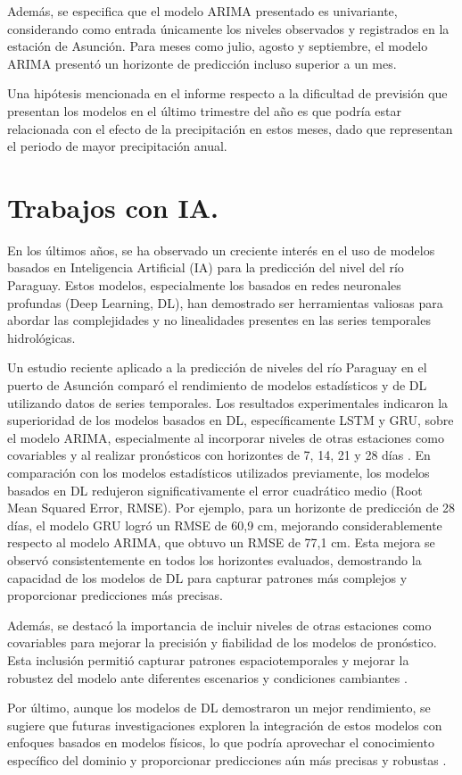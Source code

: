 Además, se especifica que el modelo ARIMA presentado es univariante, considerando como entrada únicamente los niveles observados y registrados en la estación de Asunción. Para meses como julio, agosto y septiembre, el modelo ARIMA presentó un horizonte de predicción incluso superior a un mes.

Una hipótesis mencionada en el informe respecto a la dificultad de previsión que presentan los modelos en el último trimestre del año es que podría estar relacionada con el efecto de la precipitación en estos meses, dado que representan el periodo de mayor precipitación anual.

\section{Trabajos con IA.}

En los últimos años, se ha observado un creciente interés en el uso de modelos basados en Inteligencia Artificial (IA) para la predicción del nivel del río Paraguay. Estos modelos, especialmente los basados en redes neuronales profundas (Deep Learning, DL), han demostrado ser herramientas valiosas para abordar las complejidades y no linealidades presentes en las series temporales hidrológicas.

Un estudio reciente aplicado a la predicción de niveles del río Paraguay en el puerto de Asunción comparó el rendimiento de modelos estadísticos y de DL utilizando datos de series temporales. Los resultados experimentales indicaron la superioridad de los modelos basados en DL, específicamente LSTM y GRU, sobre el modelo ARIMA, especialmente al incorporar niveles de otras estaciones como covariables y al realizar pronósticos con horizontes de 7, 14, 21 y 28 días \cite{amarilla2023comparative}. En comparación con los modelos estadísticos utilizados previamente, los modelos basados en DL redujeron significativamente el error cuadrático medio (Root Mean Squared Error, RMSE). Por ejemplo, para un horizonte de predicción de 28 días, el modelo GRU logró un RMSE de 60,9 cm, mejorando considerablemente respecto al modelo ARIMA, que obtuvo un RMSE de 77,1 cm. Esta mejora se observó consistentemente en todos los horizontes evaluados, demostrando la capacidad de los modelos de DL para capturar patrones más complejos y proporcionar predicciones más precisas.

Además, se destacó la importancia de incluir niveles de otras estaciones como covariables para mejorar la precisión y fiabilidad de los modelos de pronóstico. Esta inclusión permitió capturar patrones espaciotemporales y mejorar la robustez del modelo ante diferentes escenarios y condiciones cambiantes \cite{amarilla2023comparative}.

Por último, aunque los modelos de DL demostraron un mejor rendimiento, se sugiere que futuras investigaciones exploren la integración de estos modelos con enfoques basados en modelos físicos, lo que podría aprovechar el conocimiento específico del dominio y proporcionar predicciones aún más precisas y robustas \cite{amarilla2023comparative}.

